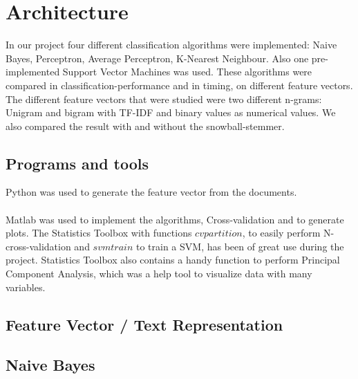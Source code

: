 \chapter{Architecture}
In our project four different classification algorithms were implemented: Naive Bayes, Perceptron, Average Perceptron, K-Nearest Neighbour. Also one pre-implemented Support Vector Machines was used. 
These algorithms were compared in classification-performance and in timing, on different feature vectors.
The different feature vectors that were studied were two different n-grams: Unigram and bigram with TF-IDF and binary values as numerical values. We also compared the result with and without the snowball-stemmer.
\section{Programs and tools}
Python was used to generate the feature vector from the documents. 
\\\\
Matlab was used to implement the algorithms, Cross-validation and to generate plots. The Statistics Toolbox with functions $cvpartition$, to easily perform N-cross-validation and $svmtrain$ to train a SVM, has been of great use during the project. Statistics Toolbox also contains a handy function to perform Principal Component Analysis, which was a help tool to visualize data with many variables. 

\section{Feature Vector / Text Representation}

\section{Naive Bayes}


